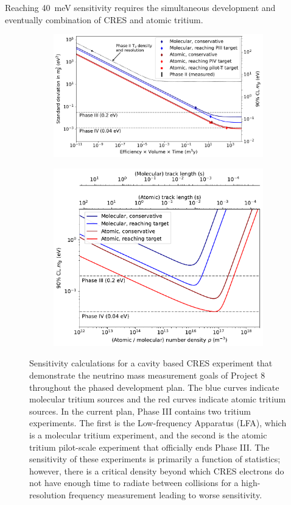 Reaching 40~meV sensitivity requires the simultaneous development and eventually combination of CRES and atomic tritium.
\begin{figure}[htbp]
    \centering
    \begin{subfigure}{0.725\textwidth}
        \includegraphics*[width=\textwidth]{figs/Chapter-3/sensitivity_vs_exposure_curve.pdf}
    \end{subfigure}
    \begin{subfigure}{0.67\textwidth}
        \includegraphics*[width=\textwidth]{figs/Chapter-3/sensitivity_vs_density_curve.pdf}
    \end{subfigure}
    \caption{Sensitivity calculations for a cavity based CRES experiment that demonstrate the neutrino mass measurement goals of Project 8 throughout the phased development plan. The blue curves indicate molecular tritium sources and the red curves indicate atomic tritium sources. In the current plan, Phase III contains two tritium experiments. The first is the Low-frequency Apparatus (LFA), which is a molecular tritium experiment, and the second is the atomic tritium pilot-scale experiment that officially ends Phase III. The sensitivity of these experiments is primarily a function of statistics; however, there is a critical density beyond which CRES electrons do not have enough time to radiate between collisions for a high-resolution frequency measurement leading to worse sensitivity. }
    \label{fig:chap3-sensitivity-calculations}
\end{figure}
